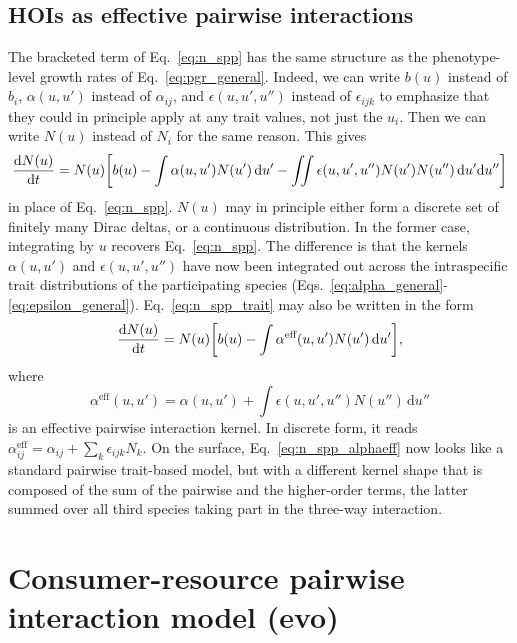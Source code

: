 \documentclass[10pt]{article}
\newcommand{\ud}{\text{d}}
\let\originalleft\left
\let\originalright\right
\renewcommand{\left}{\mathopen{}\mathclose\bgroup\originalleft}
\renewcommand{\right}{\aftergroup\egroup\originalright}
\begin{document}
\subsection{HOIs as effective pairwise interactions} \label{sec:eff_pair}

The bracketed term of Eq.~\ref{eq:n_spp} has the same structure as the phenotype-level growth rates of Eq.~\ref{eq:pgr_general}. Indeed, we can write $b(u)$ instead of $b_i$, $\alpha(u,u')$ instead of $\alpha_{ij}$, and $\epsilon(u,u',u'')$ instead of $\epsilon_{ijk}$ to emphasize that they could in principle apply at any trait values, not just the $u_i$. Then we can write $N(u)$ instead of $N_i$ for the same reason. This gives
\begin{equation}
  \label{eq:n_spp_trait}
  \frac{\ud N(u)}{\ud t}
  = N(u) \left[ b(u)
  - \int \alpha(u,u') N(u') \,\ud u'
  - \iint \epsilon(u,u',u'') N(u') N(u'') \,\ud u' \ud u'' \right]
\end{equation}
in place of Eq.~\ref{eq:n_spp}. $N(u)$ may in principle either form a discrete set of finitely many Dirac deltas, or a continuous distribution. In the former case, integrating by $u$ recovers Eq.~\ref{eq:n_spp}. The difference is that the kernels $\alpha(u,u')$ and $\epsilon(u,u',u'')$ have now been integrated out across the intraspecific trait distributions of the participating species (Eqs.~\ref{eq:alpha_general}-\ref{eq:epsilon_general}). Eq.~\ref{eq:n_spp_trait} may also be written in the form
\begin{equation}
  \label{eq:n_spp_alphaeff}
  \frac{\ud N(u)}{\ud t}
  = N(u) \left[ b(u)
  - \int \alpha^{\text{eff}}(u,u') N(u') \,\ud u' \right] ,
\end{equation}
where
\begin{equation}
  \label{eq:alphaeff}
  \alpha^{\text{eff}}(u,u')
  = \alpha(u,u')
  + \int \epsilon(u,u',u'') N(u'') \,\ud u''
\end{equation}
is an effective pairwise interaction kernel. In discrete form, it reads $\alpha_{ij}^{\text{eff}} = \alpha_{ij} + \sum_k \epsilon_{ijk} N_k$. On the surface, Eq.~\ref{eq:n_spp_alphaeff} now looks like a standard pairwise trait-based model, but with a different kernel shape that is composed of the sum of the pairwise and the higher-order terms, the latter summed over all third species taking part in the three-way interaction.


\section{Consumer-resource pairwise interaction model (evo)} \label{sec:evo}
\end{document}

